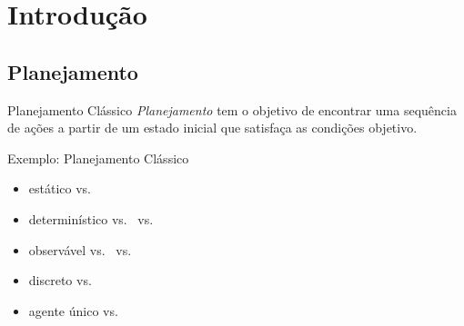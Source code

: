 \documentclass{beamer}
\begin{document}
\section{Introdução}

\subsection{Planejamento}
\begin{frame}{Planejamento Clássico}
\emph{Planejamento} tem o objetivo de encontrar uma \alert{sequência de ações} a partir de um \alert{estado inicial} que satisfaça as \alert{condições objetivo}.
    \begin{exampleblock}{\strut Exemplo: Planejamento Clássico}
      \begin{itemize}
      \item \alert{estático} vs.\ 
        \pause
      \item \alert{determinístico} vs.\ 
        vs.\ 
        \pause
      \item \alert{observável}
        vs.\ 
        vs.\ 
        \pause
      \item \alert{discreto} vs.\ 
        \pause
      \item \alert{agente único} vs.\ 
      \end{itemize}

    \end{exampleblock}
\end{frame}
\end{document}
